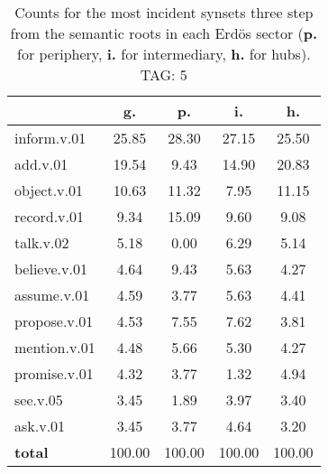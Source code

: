 \begin{table}[h!]
\begin{center}
\begin{tabular}{| l | c | c | c | c |}\hline
 & g. & p. & i. & h. \\\hline
inform.v.01 & 25.85  & 28.30  & 27.15  & 25.50 \\\hline
add.v.01 & 19.54  & 9.43  & 14.90  & 20.83 \\\hline
object.v.01 & 10.63  & 11.32  & 7.95  & 11.15 \\\hline
record.v.01 & 9.34  & 15.09  & 9.60  & 9.08 \\\hline
talk.v.02 & 5.18  & 0.00  & 6.29  & 5.14 \\\hline
believe.v.01 & 4.64  & 9.43  & 5.63  & 4.27 \\\hline
assume.v.01 & 4.59  & 3.77  & 5.63  & 4.41 \\\hline
propose.v.01 & 4.53  & 7.55  & 7.62  & 3.81 \\\hline
mention.v.01 & 4.48  & 5.66  & 5.30  & 4.27 \\\hline
promise.v.01 & 4.32  & 3.77  & 1.32  & 4.94 \\\hline
see.v.05 & 3.45  & 1.89  & 3.97  & 3.40 \\\hline
ask.v.01 & 3.45  & 3.77  & 4.64  & 3.20 \\\hline
{{\bf total}} & 100.00  & 100.00  & 100.00  & 100.00 \\\hline
\end{tabular}
\caption{Counts for the most incident synsets three step from the semantic roots in each Erd\"os sector ({\bf p.} for periphery, {\bf i.} for intermediary, {\bf h.} for hubs). TAG: 5}
\end{center}
\end{table}
